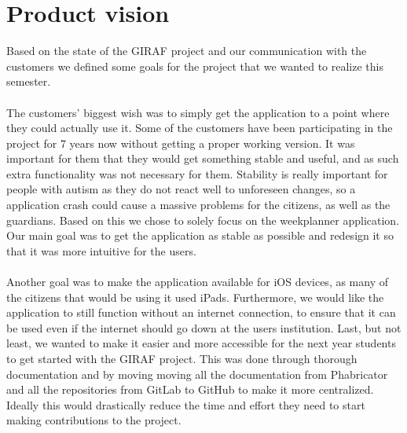 \section{Product vision}
Based on the state of the GIRAF project and our communication with the customers we defined some goals for the project that we wanted to realize this semester.
\\\\
The customers' biggest wish was to simply get the application to a point where they could actually use it.
Some of the customers have been participating in the project for 7 years now without getting a proper working version.
It was important for them that they would get something stable and useful, and as such extra functionality was not necessary for them.
Stability is really important for people with autism as they do not react well to unforeseen changes, so a application crash could cause a massive problems for the citizens, as well as the guardians.
Based on this we chose to solely focus on the weekplanner application.
Our main goal was to get the application as stable as possible and redesign it so that it was more intuitive for the users.
\\\\
Another goal was to make the application available for iOS devices, as many of the citizens that would be using it used iPads.
Furthermore, we would like the application to still function without an internet connection, to ensure that it can be used even if the internet should go down at the users institution.
Last, but not least, we wanted to make it easier and more accessible for the next year students to get started with the GIRAF project.
This was done through thorough  documentation and by moving moving all the documentation from Phabricator and all the repositories from GitLab to GitHub to make it more centralized.
Ideally this would drastically reduce the time and effort they need to start making contributions to the project.